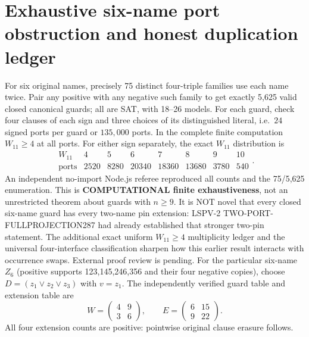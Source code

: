 \documentclass[11pt]{article}
\begin{document}
\section{Exhaustive six-name port obstruction and honest duplication ledger}
For six original names, precisely 75 distinct four-triple families use each name twice. Pair any positive with any negative such family to get exactly 5,625 valid closed canonical guards; all are SAT, with 18--26 models. For each guard, check four clauses of each sign and three choices of its distinguished literal, i.e.\ $24$ signed ports per guard or $135,000$ ports. In the complete finite computation $W_{11}\ge4$ at all ports. For either sign separately, the exact $W_{11}$ distribution is
\[
\begin{array}{c|rrrrrrr}
W_{11}&4&5&6&7&8&9&10\\\hline
\text{ports}&2520&8280&20340&18360&13680&3780&540
\end{array}.
\]
An independent no-import Node.js referee reproduced all counts and the 75/5,625 enumeration. This is \textbf{COMPUTATIONAL finite exhaustiveness}, not an unrestricted theorem about guards with $n\ge9$. It is NOT novel that every closed six-name guard has every two-name pin extension: LSPV-2 TWO-PORT-FULLPROJECTION287 had already established that stronger two-pin statement. The additional exact uniform $W_{11}\ge4$ multiplicity ledger and the universal four-interface classification sharpen how this earlier result interacts with occurrence swaps. External proof review is pending.
For the particular six-name $Z_6$ (positive supports 123,145,246,356 and their four negative copies), choose $D=(z_1\lor z_2\lor z_3)$ with $v=z_1$. The independently verified guard table and extension table are
\[
W=\begin{pmatrix}4&9\\3&6\end{pmatrix},
\qquad E=\begin{pmatrix}6&15\\9&22\end{pmatrix}.
\]
All four extension counts are positive: pointwise original clause erasure follows.
\end{document}
